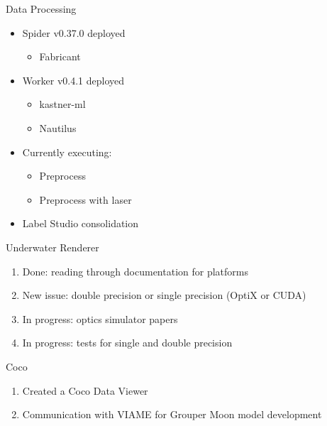 \begin{frame}{Data Processing}
    \begin{itemize}
        \item Spider v0.37.0 deployed
        \begin{itemize}
            \item Fabricant
        \end{itemize}
        \item Worker v0.4.1 deployed
        \begin{itemize}
            \item kastner-ml
            \item Nautilus
        \end{itemize}
        \item Currently executing:
        \begin{itemize}
            \item Preprocess
            \item Preprocess with laser
        \end{itemize}
        \item Label Studio consolidation
    \end{itemize}
\end{frame}

\begin{frame}{Underwater Renderer}
    \begin{enumerate}
	\item Done: reading through documentation for platforms
	\item New issue: double precision or single precision (OptiX or CUDA)
	\item In progress: optics simulator papers
	\item In progress: tests for single and double precision
    \end{enumerate}
\end{frame}

\begin{frame}{Coco}
\begin{enumerate}
\item Created a Coco Data Viewer
\item Communication with VIAME for Grouper Moon model development
\end{enumerate}
\end{frame}

